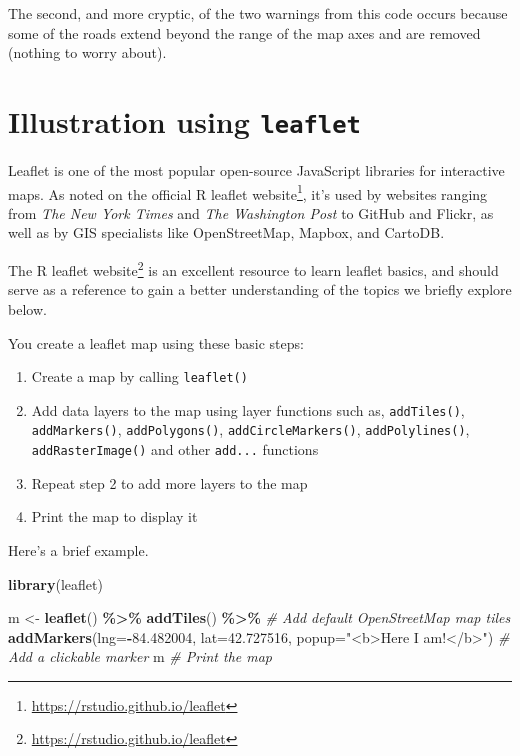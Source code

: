 \documentclass[
]{krantz}
\newenvironment{Shaded}{\begin{snugshade}}{\end{snugshade}}
\newcommand{\CommentTok}[1]{\textcolor[rgb]{0.56,0.35,0.01}{\textit{#1}}}
\newcommand{\DataTypeTok}[1]{\textcolor[rgb]{0.13,0.29,0.53}{#1}}
\newcommand{\FloatTok}[1]{\textcolor[rgb]{0.00,0.00,0.81}{#1}}
\newcommand{\KeywordTok}[1]{\textcolor[rgb]{0.13,0.29,0.53}{\textbf{#1}}}
\newcommand{\NormalTok}[1]{#1}
\newcommand{\OperatorTok}[1]{\textcolor[rgb]{0.81,0.36,0.00}{\textbf{#1}}}
\newcommand{\StringTok}[1]{\textcolor[rgb]{0.31,0.60,0.02}{#1}}
\providecommand{\tightlist}{%
  \setlength{\itemsep}{0pt}\setlength{\parskip}{0pt}}
\renewcommand{\href}[2]{#2\footnote{\url{#1}}}
\begin{document}
The second, and more cryptic, of the two warnings from this code occurs because some of the roads extend beyond the range of the map axes and are removed (nothing to worry about).

\hypertarget{illustration-using-leaflet}{%
\section{\texorpdfstring{Illustration using \texttt{leaflet}}{Illustration using leaflet}}\label{illustration-using-leaflet}}

Leaflet is one of the most popular open-source JavaScript libraries for interactive maps. As noted on the official \href{https://rstudio.github.io/leaflet}{R leaflet website}, it's used by websites ranging from \emph{The New York Times} and \emph{The Washington Post} to GitHub and Flickr, as well as by GIS specialists like OpenStreetMap, Mapbox, and CartoDB.

The \href{https://rstudio.github.io/leaflet}{R leaflet website} is an excellent resource to learn leaflet basics, and should serve as a reference to gain a better understanding of the topics we briefly explore below.

You create a leaflet map using these basic steps:

\begin{enumerate}
\def\labelenumi{\arabic{enumi}.}
\tightlist
\item
  Create a map by calling \texttt{leaflet()}
\item
  Add data layers to the map using layer functions such as, \texttt{addTiles()}, \texttt{addMarkers()}, \texttt{addPolygons()}, \texttt{addCircleMarkers()}, \texttt{addPolylines()}, \texttt{addRasterImage()} and other \texttt{add...} functions
\item
  Repeat step 2 to add more layers to the map
\item
  Print the map to display it
\end{enumerate}

Here's a brief example.

\begin{Shaded}
\begin{Highlighting}[]
\KeywordTok{library}\NormalTok{(leaflet)}

\NormalTok{m \textless{}{-}}\StringTok{ }\KeywordTok{leaflet}\NormalTok{() }\OperatorTok{\%\textgreater{}\%}
\StringTok{      }\KeywordTok{addTiles}\NormalTok{() }\OperatorTok{\%\textgreater{}\%}\StringTok{  }\CommentTok{\# Add default OpenStreetMap map tiles}
\StringTok{      }\KeywordTok{addMarkers}\NormalTok{(}\DataTypeTok{lng=}\OperatorTok{{-}}\FloatTok{84.482004}\NormalTok{, }\DataTypeTok{lat=}\FloatTok{42.727516}\NormalTok{, }
                 \DataTypeTok{popup=}\StringTok{"\textless{}b\textgreater{}Here I am!\textless{}/b\textgreater{}"}\NormalTok{) }\CommentTok{\# Add a clickable marker}
\NormalTok{m      }\CommentTok{\# Print the map}
\end{Highlighting}
\end{Shaded}
\end{document}
